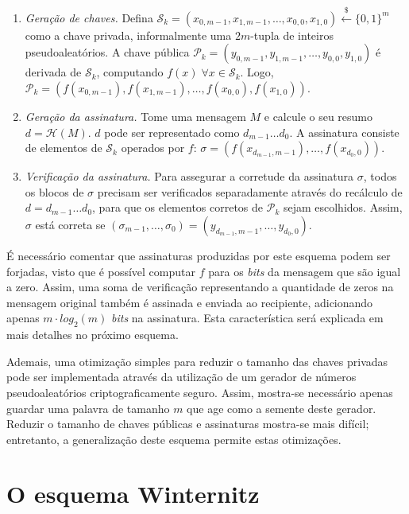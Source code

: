 \documentclass[12pt]{report}
\newcommand{\pk}{$\mathcal{P}_k$}
\newcommand{\sk}{$\mathcal{S}_k$}
\newcommand{\binwds}[1]{\{0, 1\}^{#1}}
\begin{document}
\begin{enumerate}

    \item[] \emph{Geração de chaves.} Defina $\text{\sk{}} = (x_{0, m-1}, x_{1, m-1}, \dots, x_{0,0}, x_{1,0}) \stackrel{\$}{\longleftarrow} \binwds{m}$ como a chave privada, informalmente uma $2m$-tupla de inteiros pseudoaleatórios. A chave pública $\text{\pk{}} = (y_{0, m-1}, y_{1, m-1}, \dots, y_{0,0}, y_{1,0})$ é derivada de \sk{}, computando $f(x) \; \forall x \in  \text{\sk{}}$. Logo, $\text{\pk{}} = (f(x_{0, m-1}), f(x_{1, m-1}), \dots, f(x_{0,0}), f(x_{1,0}))$.

    \item[] \emph{Geração da assinatura.} Tome uma mensagem $M$ e calcule o seu resumo $d = \mathcal{H}(M)$. $d$ pode ser representado como $d_{m-1} \dots d_0$. A assinatura consiste de elementos de \sk{} operados por $f$: $\sigma = (f(x_{d_{m-1}, m-1}), \dots, f(x_{d_0, 0}))$.
    
    \item[] \emph{Verificação da assinatura.} Para assegurar a corretude da assinatura $\sigma$, todos os blocos de $\sigma$ precisam ser verificados separadamente através do recálculo de $d = d_{m-1} \dots d_0$, para que
    os elementos corretos de \pk{} sejam escolhidos. Assim, $\sigma$ está
    correta se $(\sigma_{m-1}, \dots, \sigma_0) = (y_{d_{m-1}, m-1}, \dots, y_{d_{0}, 0})$.
    
\end{enumerate}

É necessário comentar que assinaturas produzidas por este esquema podem ser
forjadas, visto que é possível computar $f$ para os \emph{bits} da mensagem
que são igual a zero. Assim, uma soma de verificação representando a
quantidade de zeros na mensagem original também é assinada e enviada ao
recipiente, adicionando apenas $m \cdot log_2(m)$ \emph{bits} na assinatura.
Esta característica será explicada em mais detalhes no próximo esquema.

Ademais, uma otimização simples para reduzir o tamanho das chaves privadas pode ser
implementada através da utilização de um gerador de números pseudoaleatórios
criptograficamente seguro. Assim, mostra-se necessário apenas guardar uma
palavra de tamanho $m$ que age como a semente deste gerador. Reduzir
o tamanho de chaves públicas e assinaturas mostra-se mais difícil; entretanto,
a generalização deste esquema permite estas otimizações.

\section{O esquema Winternitz}
\end{document}
